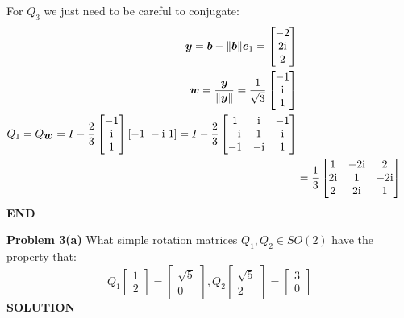 \documentclass[12pt,a4paper]{article}
\def\b{ {\vc b} }
\def\e{ {\vc e} }
\def\y{ {\vc y} }
\def\w{ {\vc w} }
\begin{document}
For $Q_3$ we just need to be careful to conjugate:
\begin{align*}
\ensuremath{\bm{\y}} = \ensuremath{\bm{\b}} - \| \ensuremath{\bm{\b}}\| \ensuremath{\bm{\e}}_1 =  \begin{bmatrix} -2 \\ 2{\rm i} \\ 2 \end{bmatrix} \\
\ensuremath{\bm{\w}} = {\ensuremath{\bm{\y}} \over \|\ensuremath{\bm{\y}}\|} = {1 \over \sqrt{3}} \begin{bmatrix} -1 \\ {\rm i} \\ 1 \end{bmatrix} \\
Q_1 = Q_{\ensuremath{\bm{\w}}} = I - {2 \over 3} \begin{bmatrix} -1 \\ {\rm i} \\ 1 \end{bmatrix}  [-1\ -{\rm i}\ 1] = 
I - {2 \over 3} \begin{bmatrix} 1 & {\rm i} & -1 \\ -{\rm i}& 1 & {\rm i} \\ -1 &-{\rm i} & 1 \end{bmatrix} \\
&={1 \over 3} \begin{bmatrix} 1 & -2{\rm i} & 2 \\ 2{\rm i} & 1 & -2{\rm i} \\ 2& 2{\rm i} & 1 \end{bmatrix} 
\end{align*}
\textbf{END}

\textbf{Problem 3(a)} What simple rotation matrices $Q_1,Q_2 \ensuremath{\in} SO(2)$ have the property that:
\[
Q_1 \begin{bmatrix} 1 \\ 2 \end{bmatrix} =\begin{bmatrix} \sqrt{5} \\ 0 \end{bmatrix},  Q_2 \begin{bmatrix} \sqrt{5} \\ 2 \end{bmatrix} =  \begin{bmatrix} 3 \\ 0 \end{bmatrix}
\]
\textbf{SOLUTION}
\end{document}
